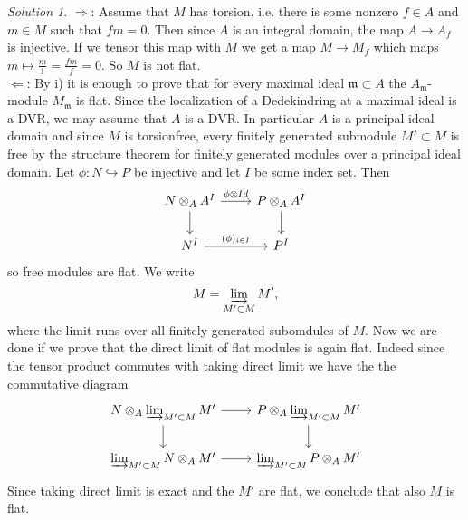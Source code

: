 \documentclass[10pt]{article}
\theoremstyle{definition}
\theoremstyle{remark}
\newtheorem*{solution}{Solution}
\begin{document}
\begin{solution}
$\Rightarrow$: Assume that $M$ has torsion, i.e. there is some nonzero $f\in A$ and $m \in M$ such that $fm=0$.
Then since $A$ is an integral domain, the map $A \rightarrow A_f$ is injective. If we tensor this map with $M$ we get a map $M \rightarrow M_f$ which maps $m \mapsto \frac{m}{1} = \frac{fm}{f} = 0$. So $M$ is not flat.\\

$\Leftarrow$: By i) it is enough to prove that for every maximal ideal $\mathfrak{m} \subset A$ the $A_{\mathfrak{m}}$-module $M_{\mathfrak{m}}$ is flat. Since the localization of a Dedekindring at a maximal ideal is a DVR, we may assume that $A$ is a DVR. In particular $A$ is a principal ideal domain and since $M$ is torsionfree, every finitely generated submodule $M'\subset M$ is free by the structure theorem for finitely generated modules over a principal ideal domain.
Let $ \phi: N \hookrightarrow P$ be injective and let $I$ be some index set. Then 
\[
  \begin{tikzcd}
    N \otimes_A A^I \arrow{r}{\phi \otimes Id} \arrow[swap]{d}{} & P \otimes_A A^I \arrow{d}{} \\
      N^I \arrow{r}{(\phi)_{i\in I}} & P^I
  \end{tikzcd}
\]
so free modules are flat. 
We write $$ M =\varinjlim_{ M'\subset M}  M',$$ where the limit runs over all finitely generated subomdules of $M$.
Now we are done if we prove that the direct limit of flat modules is again flat. Indeed since the tensor product commutes with taking direct limit we have the the commutative diagram
\[
  \begin{tikzcd}
    N \otimes_A \varinjlim_{ M'\subset M}  M' \arrow{r}{} \arrow[]{d}{} & P \otimes_A \varinjlim_{ M'\subset M}  M' \arrow{d}{} \\
      \varinjlim_{ M'\subset M} N\otimes_A M' \arrow{r}{} & \varinjlim_{ M'\subset M}  P \otimes_A M'
  \end{tikzcd}
\]
Since taking direct limit is exact and the $M'$ are flat, we conclude that also $M$ is flat.
\end{solution}
\end{document}
